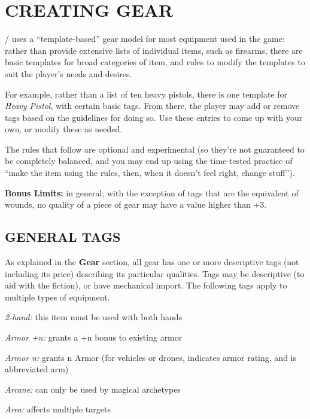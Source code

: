 \documentclass[oneside,10pt]{article}
\begin{document}
\section{CREATING GEAR}
\begin{multicols}{2}
\SW/ uses a ``template-based'' gear model for most
equipment used in the game: rather than provide extensive
lists of individual items, such as firearms, there are basic templates for broad categories of item, and rules to modify the
templates to suit the player’s needs and desires.

For example, rather than a list of ten heavy pistols, there is one
template for \textit{Heavy Pistol}, with certain basic tags. From there,
the player may add or remove tags based on the guidelines
for doing so. Use these entries to come up with your own, or
modify these as needed.

The rules that follow are optional and experimental (so they’re
not guaranteed to be completely balanced, and you may end
up using the time-tested practice of ``make the item using the
rules, then, when it doesn’t feel right, change stuff'').

\begin{dent}

\textbf{Bonus Limits:} in general, with the exception of tags that
are the equivalent of wounds, no quality of a piece of gear
may have a value higher than +3.
\end{dent}

\subsection{GENERAL TAGS}
As explained in the \textbf{Gear} section, all gear has one or more descriptive tags (not including its price) describing its particular
qualities. Tags may be descriptive (to aid with the fiction), or
have mechanical import. The following tags apply to multiple
types of equipment.
\begin{dent}

\textit{2-hand:} this item must be used with both hands

\textit{Armor +n:} grants a +n bonus to existing armor

\textit{Armor n:} grants n Armor (for vehicles or drones, indicates
armor rating, and is abbreviated arm)

\textit{Arcane:} can only be used by magical archetypes

\textit{Area:} affects multiple targets


\end{dent}
\end{multicols}
\end{document}
